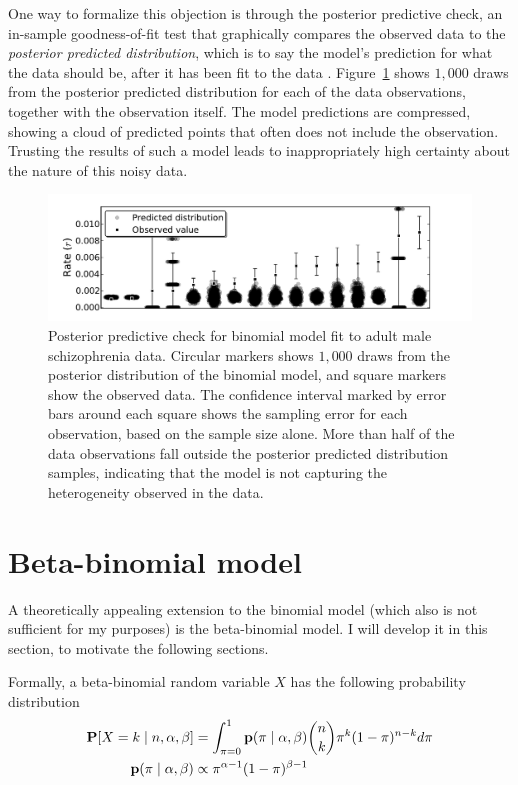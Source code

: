 One way to formalize this objection is through the posterior
predictive check, an in-sample goodness-of-fit test that graphically
compares the observed data to the \emph{posterior predicted
  distribution}, which is to say the model's prediction for what the
data should be, after it has been fit to the data \cite{Gelman book or
  paper}.  Figure~\ref{rate-model-binom-ppc} shows $1,000$ draws from
the posterior predicted distribution for each of the data
observations, together with the observation itself.  The model
predictions are compressed, showing a cloud of predicted points that
often does not include the observation.  Trusting the results of such
a model leads to inappropriately high certainty about the nature of
this noisy data.

\begin{figure}[ht]
\begin{center}
\includegraphics[width=\textwidth]{binomial-model-ppc.pdf}
\caption{Posterior predictive check for binomial model fit to adult
  male schizophrenia data.  Circular markers shows $1,000$ draws from
  the posterior distribution of the binomial model, and square markers
  show the observed data.  The confidence interval marked by error
  bars around each square shows the sampling error for each
  observation, based on the sample size alone. More than half of the
  data observations fall outside the posterior predicted distribution
  samples, indicating that the model is not capturing the
  heterogeneity observed in the data.}
\label{rate-model-binom-ppc}
\end{center}
\end{figure}


\section{Beta-binomial model}
\label{beta-binomial-model}
A theoretically appealing extension to the binomial model (which also
is not sufficient for my purposes) is the beta-binomial model.  I will
develop it in this section, to motivate the following sections.

Formally, a beta-binomial random variable $X$ has the following
probability distribution
\begin{align*}
\mathbf{P}[X = k\;|\; n, \alpha, \beta]  &= \int_{\pi=0}^1 \mathbf{p}(\pi\;|\; \alpha, \beta) \binom{n}{k}\pi^k(1-\pi)^{n-k} d\pi\\
\mathbf{p}(\pi\;|\; \alpha, \beta) &\propto \pi^{\alpha-1}(1-\pi)^{\beta-1}
\end{align*}

